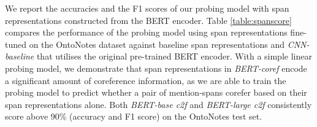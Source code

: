 \documentclass[11pt]{article}
\begin{document}







We report the accuracies and the F1 scores of our probing model with span representations constructed from the BERT encoder. Table \ref{table:spanscore} compares the performance of the probing model using span representations fine-tuned on the OntoNotes dataset against baseline span representations and \textit{CNN-baseline} that utilises the original pre-trained BERT encoder. With a simple linear probing model, we demonstrate that span representations in \textit{BERT-coref} encode a significant amount of coreference information, as we are able to train the probing model to predict whether a pair of mention-spans corefer based on their span representations alone. Both \textit{BERT-base c2f} and \textit{BERT-large c2f} consistently score above 90\% (accuracy and F1 score) on the OntoNotes test set. 
\end{document}
